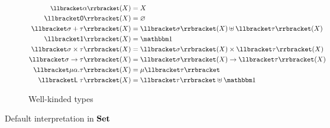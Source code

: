 \begin{figure}
\begin{subfigure}{\linewidth}
  \begin{align*}
  \small
  \sem{\alpha}(X) &= X
  \\
  \sem{\tyZero}(X) &= \varnothing
  \\
  \sem{\sigma \tySum \tau}(X) &= \sem{\sigma}(X) \uplus \sem{\tau}(X)
  \\
  \sem{\tyUnit}(X) &= \One
  \\
  \sem{\sigma \tyProd \tau}(X) &= \sem{\sigma}(X) \times \sem{\tau}(X)
  \\
  \sem{\sigma \tyFun \tau}(X) &= \sem{\sigma}(X) \to \sem{\tau}(X)
  \\
  \sem{\mu\alpha.\tau}(X) &= \mu\sem{\tau}
  \\
  \sem{\tyLift\;\tau}(X) &= \sem{\tau} \uplus \One
  \end{align*}
  \caption{Well-kinded types}
  \label{fig:set-semantics:types}
\end{subfigure}
\caption{Default interpretation in $\mathbf{Set}$}
\end{figure}
